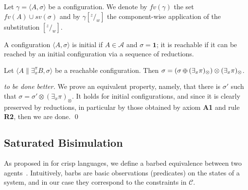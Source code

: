 \documentclass{llncs}
\def\1{{\mathbf 1}}
\def\1{{\mathbf 1}}
\def\odiv{\, {\ominus\hspace{-7.7pt} \div} \,}
\begin{document}
Let $\gamma = \langle A, \sigma \rangle$ be a configuration.
%
We denote by $fv(\gamma)$ the set $fv(A) \cup sv(\sigma)$ and by
$\gamma[^z/_w]$ the component-wise application of the substitution $[^z/_w]$.

\begin{definition}
A configuration $\langle A, \sigma \rangle$ is initial if $A\in \mathcal{A}$
and $\sigma = \1$; it is reachable if it can be reached by an initial configuration 
via a sequence of reductions.
\end{definition}

\begin{lemma}[On monotonicity, II]
\label{mono2}
Let $\langle A \parallel \exists_x^\pi B, \sigma \rangle$ 
be a reachable configuration.
Then $\sigma = (\sigma \odiv (\exists_x \pi)_\otimes) \otimes (\exists_x \pi)_\otimes$.
\end{lemma}

\begin{proof}[to be done better]
We prove an equivalent property, namely, that there is $\sigma'$ such that 
$\sigma = \sigma' \otimes (\exists_x \pi)_\otimes$. 
%
It holds for initial configurations, and since it is clearly preserved by reductions, 
in particular by those obtained by axiom \mbox{\bf A1} and rule \mbox{\bf R2},
then we are done.
\qed
%
\end{proof}


\subsection{Saturated Bisimulation}\label{sec:saturated}
As proposed in \cite{pippo} for crisp languages, we define a barbed equivalence between two agents~\cite{barbed}.  
%
Intuitively, barbs are basic observations (predicates) on the states of a system, and in our case they correspond 
to the constraints in $\mathcal{C}$.
\end{document}
